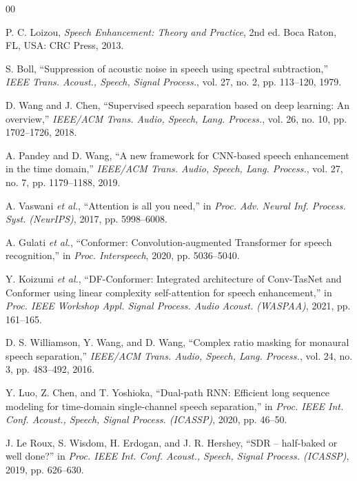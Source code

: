 \documentclass[conference]{IEEEtran}
\begin{document}

\begin{thebibliography}{00}

 P. C. Loizou, \emph{Speech Enhancement: Theory and Practice}, 2nd ed. Boca Raton, FL, USA: CRC Press, 2013.

 S. Boll, ``Suppression of acoustic noise in speech using spectral subtraction,'' \emph{IEEE Trans. Acoust., Speech, Signal Process.}, vol. 27, no. 2, pp. 113--120, 1979.

 D. Wang and J. Chen, ``Supervised speech separation based on deep learning: An overview,'' \emph{IEEE/ACM Trans. Audio, Speech, Lang. Process.}, vol. 26, no. 10, pp. 1702--1726, 2018.

 A. Pandey and D. Wang, ``A new framework for CNN-based speech enhancement in the time domain,'' \emph{IEEE/ACM Trans. Audio, Speech, Lang. Process.}, vol. 27, no. 7, pp. 1179--1188, 2019.

 A. Vaswani \emph{et al.}, ``Attention is all you need,'' in \emph{Proc. Adv. Neural Inf. Process. Syst. (NeurIPS)}, 2017, pp. 5998--6008.

 A. Gulati \emph{et al.}, ``Conformer: Convolution-augmented Transformer for speech recognition,'' in \emph{Proc. Interspeech}, 2020, pp. 5036--5040.

 Y. Koizumi \emph{et al.}, ``DF-Conformer: Integrated architecture of Conv-TasNet and Conformer using linear complexity self-attention for speech enhancement,'' in \emph{Proc. IEEE Workshop Appl. Signal Process. Audio Acoust. (WASPAA)}, 2021, pp. 161--165.

 D. S. Williamson, Y. Wang, and D. Wang, ``Complex ratio masking for monaural speech separation,'' \emph{IEEE/ACM Trans. Audio, Speech, Lang. Process.}, vol. 24, no. 3, pp. 483--492, 2016.

 Y. Luo, Z. Chen, and T. Yoshioka, ``Dual-path RNN: Efficient long sequence modeling for time-domain single-channel speech separation,'' in \emph{Proc. IEEE Int. Conf. Acoust., Speech, Signal Process. (ICASSP)}, 2020, pp. 46--50.

 J. Le Roux, S. Wisdom, H. Erdogan, and J. R. Hershey, ``SDR -- half-baked or well done?'' in \emph{Proc. IEEE Int. Conf. Acoust., Speech, Signal Process. (ICASSP)}, 2019, pp. 626--630.


\end{thebibliography}
\end{document}
